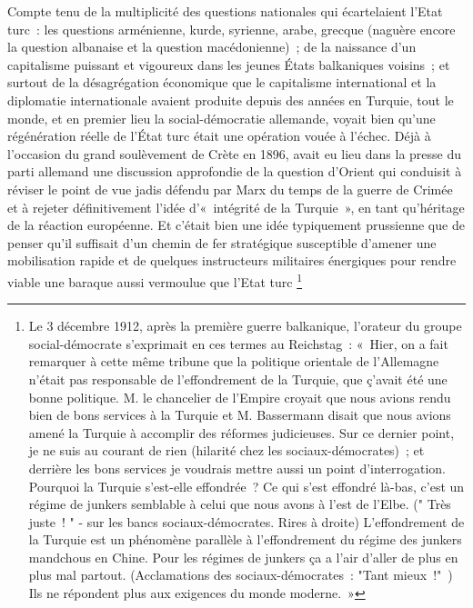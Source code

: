 \documentclass[french,twoside]{book} %
\begin{document}
Compte tenu de la multiplicité des questions nationales qui écartelaient l’Etat turc : les questions arménienne, kurde, syrienne, arabe, grecque (naguère encore la question albanaise et la question macédonienne) ; de la naissance d’un capitalisme puissant et vigoureux dans les jeunes États balkaniques voisins ; et surtout de la désagrégation économique que le capitalisme international et la diplomatie internationale avaient produite depuis des années en Turquie, tout le monde, et en premier lieu la social-démocratie allemande, voyait bien qu’une régénération réelle de l’État turc était une opération vouée à l’échec. Déjà à l’occasion du grand soulèvement de Crète en 1896, avait eu lieu dans la presse du parti allemand une discussion approfondie de la question d’Orient qui conduisit à réviser le point de vue jadis défendu par Marx du temps de la guerre de Crimée et à rejeter définitivement l’idée d’« intégrité de la Turquie », en tant qu’héritage de la réaction européenne. Et c’était bien une idée typiquement prussienne que de penser qu’il suffisait d’un chemin de fer stratégique susceptible d’amener une mobilisation rapide et de quelques instructeurs militaires énergiques pour rendre viable une baraque aussi vermoulue que l’Etat turc \footnote{ \noindent Le 3 décembre 1912, après la première guerre balkanique, l’orateur du groupe social-démocrate s’exprimait en ces termes au Reichstag : « Hier, on a fait remarquer à cette même tribune que la politique orientale de l’Allemagne n’était pas responsable de l’effondrement de la Turquie, que ç'avait été une bonne politique. M. le chancelier de l’Empire croyait que nous avions rendu bien de bons services à la Turquie et M. Bassermann disait que nous avions amené la Turquie à accomplir des réformes judicieuses. Sur ce dernier point, je ne suis au courant de rien (hilarité chez les sociaux-démocrates) ; et derrière les bons services je voudrais mettre aussi un point d’interrogation. Pourquoi la Turquie s’est-elle effondrée ? Ce qui s’est effondré là-bas, c’est un régime de junkers semblable à celui que nous avons à l’est de l’Elbe. (" Très juste ! " - sur les bancs sociaux-démocrates. Rires à droite) L'effondrement de la Turquie est un phénomène parallèle à l’effondrement du régime des junkers mandchous en Chine. Pour les régimes de junkers ça a l’air d’aller de plus en plus mal partout. (Acclamations des sociaux-démocrates : "Tant mieux !" ) Ils ne répondent plus aux exigences du monde moderne. »\par
}
\end{document}
